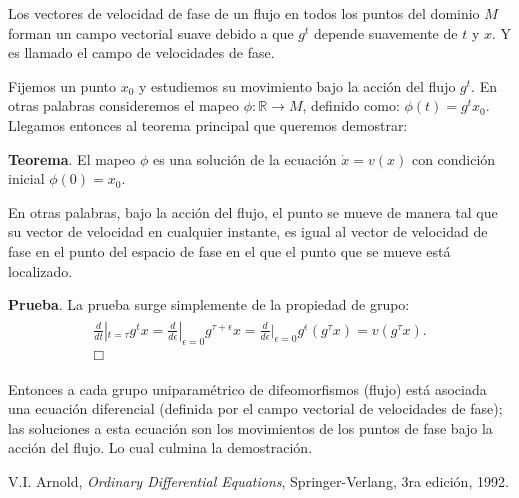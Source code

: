 \documentclass[a4paper,10pt]{article}
\numberwithin{equation}{section}
\begin{document}
Los vectores de velocidad de fase de un flujo en todos los puntos del
dominio $M$ forman un campo vectorial suave debido a que $g^t$ depende
suavemente de $t$ y $x$. Y es llamado el campo de velocidades de 
fase. 

\vspace{.3cm}

Fijemos un punto $x_0$ y estudiemos su movimiento bajo la acción del
flujo $g^t$. En otras palabras consideremos el mapeo $\phi: \mathbb{R} \rightarrow M$, 
definido como: $\phi(t) = g^t x_0$. Llegamos entonces al teorema principal 
que queremos demostrar:

\vspace{.3cm}

\textbf{Teorema}. El mapeo $\phi$ es una solución de la ecuación $\dot{x}=v(x)$ 
con condición inicial $\phi(0)=x_0$.

En otras palabras, bajo la acción del flujo, el punto se mueve de manera
tal que su vector de velocidad en cualquier instante, es igual al vector de velocidad
de fase en el punto del espacio de fase en el que el punto que se mueve
está localizado.

\vspace{.3cm}

\textbf{Prueba}. La prueba surge simplemente de la propiedad de grupo:
\begin{align}
\begin{split}
 \frac{d}{dt}|_{t=\tau} g^t x =  \frac{d}{d\epsilon}|_{\epsilon=0} g^{\tau+\epsilon} x =
  \frac{d}{d\epsilon}|_{\epsilon=0} g^\epsilon (g^\tau x) = v(g^\tau x). \\
\Box
\end{split}
\end{align}

Entonces a cada grupo uniparamétrico de difeomorfismos (flujo) está asociada una 
ecuación diferencial (definida por el campo vectorial de velocidades de fase); las
soluciones a esta ecuación son los movimientos de los puntos de fase bajo la acción del
flujo. Lo cual culmina la demostración.

\vspace{.3cm}


\begin{thebibliography}{10}
 V.I. Arnold, \emph{Ordinary Differential Equations}, Springer-Verlang,
 3ra edición, 1992.
\end{thebibliography}
\end{document}
